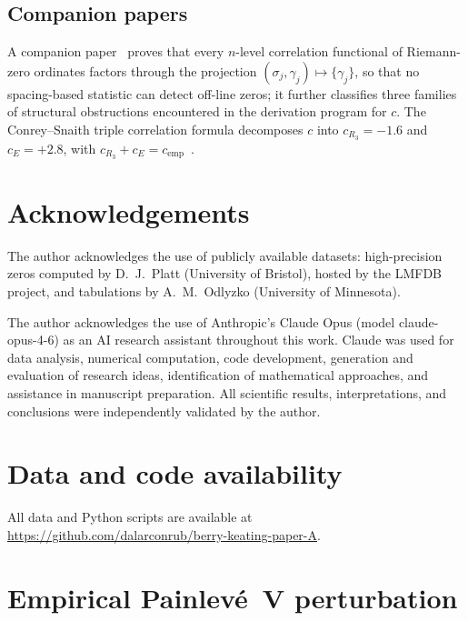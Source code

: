 \documentclass[11pt]{article}
\theoremstyle{plain}
\theoremstyle{remark}
\begin{document}
\subsection{Companion papers}

A companion paper~\cite{alarcon2026d} proves that every $n$-level
correlation functional of Riemann-zero ordinates factors through the
projection $(\sigma_j,\gamma_j)\mapsto\{\gamma_j\}$, so that no
spacing-based statistic can detect off-line zeros; it further classifies
three families of structural obstructions encountered in the derivation
program for $c$. The Conrey--Snaith triple correlation formula
decomposes $c$ into $c_{R_3} = -1.6$ and
$c_E = +2.8$, with $c_{R_3} + c_E = c_{\mathrm{emp}}$~\cite{alarcon2026b}.


\section*{Acknowledgements}

The author acknowledges the use of publicly available datasets:
high-precision zeros computed by D.~J.~Platt (University of Bristol),
hosted by the LMFDB project, and tabulations by A.~M.~Odlyzko
(University of Minnesota).

The author acknowledges the use of Anthropic's Claude Opus
(model claude-opus-4-6) as an AI research assistant throughout this work.
Claude was used for data analysis, numerical computation, code development,
generation and evaluation of research ideas, identification of mathematical
approaches, and assistance in manuscript preparation.
All scientific results, interpretations, and conclusions were independently
validated by the author.

\section*{Data and code availability}

All data and Python scripts are available at
\url{https://github.com/dalarconrub/berry-keating-paper-A}.






\appendix

\section{Empirical Painlev\'e~V perturbation}
\label{app:painleve}
\end{document}
